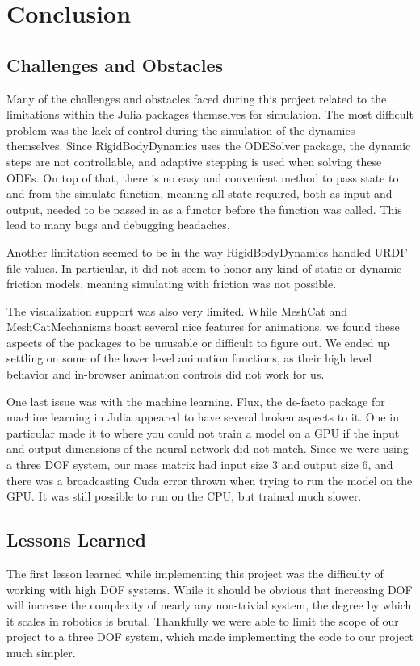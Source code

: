 \section{Conclusion}

%


\subsection*{Challenges and Obstacles}
Many of the challenges and obstacles faced during this project related to the limitations within the Julia packages themselves for simulation.
The most difficult problem was the lack of control during the simulation of the dynamics themselves.
Since RigidBodyDynamics uses the ODESolver package, the dynamic steps are not controllable, and adaptive stepping is used when solving these ODEs.
On top of that, there is no easy and convenient method to pass state to and from the simulate function, meaning all state required, both as input and output, needed to be passed in as a functor before the function was called.
This lead to many bugs and debugging headaches.

Another limitation seemed to be in the way RigidBodyDynamics handled URDF file values.
In particular, it did not seem to honor any kind of static or dynamic friction models, meaning simulating with friction was not possible.

The visualization support was also very limited.
While MeshCat and MeshCatMechanisms boast several nice features for animations, we found these aspects of the packages to be unusable or difficult to figure out.
We ended up settling on some of the lower level animation functions, as their high level behavior and in-browser animation controls did not work for us.

One last issue was with the machine learning.
Flux, the de-facto package for machine learning in Julia appeared to have several broken aspects to it.
One in particular made it to where you could not train a model on a GPU if the input and output dimensions of the neural network did not match.
Since we were using a three DOF system, our mass matrix had input size 3 and output size 6, and there was a broadcasting Cuda error thrown when trying to run the model on the GPU.
It was still possible to run on the CPU, but trained much slower.

\subsection*{Lessons Learned}
The first lesson learned while implementing this project was the difficulty of working with high DOF systems.
While it should be obvious that increasing DOF will increase the complexity of nearly any non-trivial system, the degree by which it scales in robotics is brutal.
Thankfully we were able to limit the scope of our project to a three DOF system, which made implementing the code to our project much simpler.

